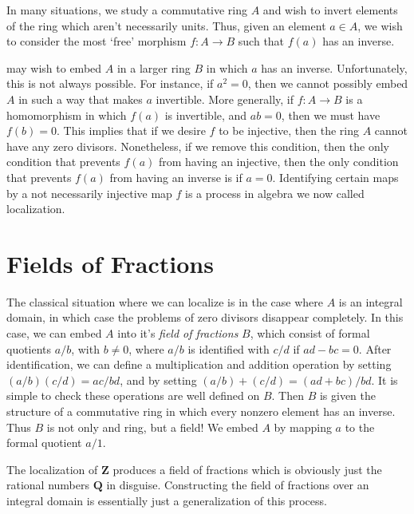 In many situations, we study a commutative ring $A$ and wish to invert elements of the ring which aren't necessarily units. Thus, given an element $a \in A$, we wish to consider the most `free' morphism $f: A \to B$ such that $f(a)$ has an inverse.

may wish to embed $A$ in a larger ring $B$ in which $a$ has an inverse. Unfortunately, this is not always possible. For instance, if $a^2 = 0$, then we cannot possibly embed $A$ in such a way that makes $a$ invertible. More generally, if $f:A \to B$ is a homomorphism in which $f(a)$ is invertible, and $ab = 0$, then we must have $f(b) = 0$. This implies that if we desire $f$ to be injective, then the ring $A$ cannot have any zero divisors. Nonetheless, if we remove this condition, then the only condition that prevents $f(a)$ from having an injective, then the only condition that prevents $f(a)$ from having an inverse is if $a = 0$. Identifying certain maps by a not necessarily injective map $f$ is a process in algebra we now called localization.

\section{Fields of Fractions}

The classical situation where we can localize is in the case where $A$ is an integral domain, in which case the problems of zero divisors disappear completely. In this case, we can embed $A$ into it's \emph{field of fractions} $B$, which consist of formal quotients $a/b$, with $b \neq 0$, where $a/b$ is identified with $c/d$ if $ad - bc = 0$. After identification, we can define a multiplication and addition operation by setting $(a/b)(c/d) = ac/bd$, and by setting $(a/b) + (c/d) = (ad + bc)/bd$. It is simple to check these operations are well defined on $B$. Then $B$ is given the structure of a commutative ring in which every nonzero element has an inverse. Thus $B$ is not only and ring, but a field! We embed $A$ by mapping $a$ to the formal quotient $a/1$.

\begin{example}
    The localization of $\mathbf{Z}$ produces a field of fractions which is obviously just the rational numbers $\mathbf{Q}$ in disguise. Constructing the field of fractions over an integral domain is essentially just a generalization of this process.
\end{example}

